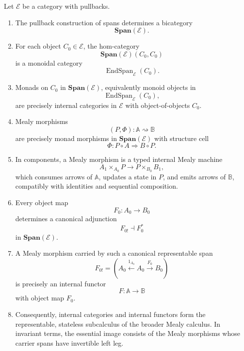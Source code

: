 \begin{theorem}
\label{thm:main-consolidation}
Let \(\mathcal E\) be a category with pullbacks.

\begin{enumerate}
\item The pullback construction of spans determines a bicategory
\[
\mathbf{Span}(\mathcal E).
\]

\item For each object \(C_0\in\mathcal E\), the hom-category
\[
\mathbf{Span}(\mathcal E)(C_0,C_0)
\]
is a monoidal category
\[
\operatorname{EndSpan}_{\mathcal E}(C_0).
\]

\item Monads on \(C_0\) in \(\mathbf{Span}(\mathcal E)\), equivalently monoid objects in
\[
\operatorname{EndSpan}_{\mathcal E}(C_0),
\]
are precisely internal categories in \(\mathcal E\) with object-of-objects \(C_0\).

\item Mealy morphisms
\[
(P,\Phi):\mathbb A\rightsquigarrow\mathbb B
\]
are precisely monad morphisms in \(\mathbf{Span}(\mathcal E)\) with structure cell
\[
\Phi:P\circ A\Rightarrow B\circ P.
\]

\item In components, a Mealy morphism is a typed internal Mealy machine
\[
A_1\times_{A_0}P
\longrightarrow
P\times_{B_0}B_1,
\]
which consumes arrows of \(\mathbb A\), updates a state in \(P\), and emits arrows of \(\mathbb B\), compatibly with identities and sequential composition.

\item Every object map
\[
F_0:A_0\to B_0
\]
determines a canonical adjunction
\[
F_{0!}\dashv F_0^\ast
\]
in \(\mathbf{Span}(\mathcal E)\).

\item A Mealy morphism carried by such a canonical representable span
\[
F_{0!}
=
\left(
A_0
\xleftarrow{1_{A_0}}
A_0
\xrightarrow{F_0}
B_0
\right)
\]
is precisely an internal functor
\[
F:\mathbb A\to\mathbb B
\]
with object map \(F_0\).

\item Consequently, internal categories and internal functors form the representable, stateless subcalculus of the broader Mealy calculus. In invariant terms, the essential image consists of the Mealy morphisms whose carrier spans have invertible left leg.
\end{enumerate}
\end{theorem}


